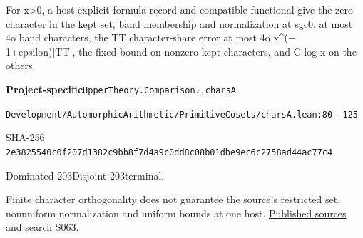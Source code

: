 
\begin{formalstatement}[D548]\label{decomp:D548}
For x>0, a host explicit-formula record and compatible functional give the zero character in the kept set, band membership and normalization at sgc0, at most 4o band characters, the TT character-share error at most 4o x\textasciicircum{}(\ensuremath{-}1+epsilon)|TT|, the fixed bound on nonzero kept characters, and C log x on the others.
\end{formalstatement}
{\small\raggedright\noindent\textsf{\bfseries Project-specific}\quad \nolinkurl{UpperTheory.Comparison₂.charsA}\par\noindent \nolinkurl{Development/AutomorphicArithmetic/PrimitiveCosets/charsA.lean:80--125}\par\noindent SHA-256 \nolinkurl{2e3825540c0f207d1382c9bb8f7d4a9c0dd8c08b01dbe9ec6c2758ad44ac77c4}\par\noindent Dominated 203\quad Disjoint 203\quad terminal.\par}
Finite character orthogonality does not guarantee the source’s restricted set, nonuniform normalization and uniform bounds at one host.
\hyperref[lit:S063]{Published sources and search S063}.
